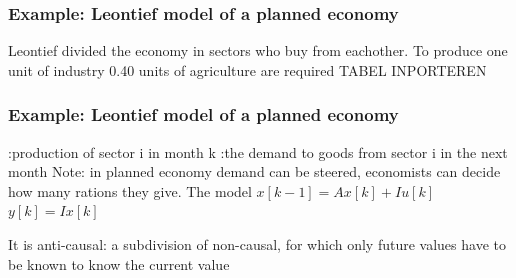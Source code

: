 \begin{frame}
	\frametitle{Example: Leontief model of a planned economy}
	Leontief divided the economy in sectors who buy from eachother.
	To produce one unit of industry 0.40 units of agriculture are required
	TABEL INPORTEREN
\end{frame}
\begin{frame}
	\frametitle{Example: Leontief model of a planned economy}
		     :production of sector i in month k
		     :the demand to goods from sector i in the next month
		     Note: in planned economy demand can be steered, economists can decide how many rations they give.
		     The model
		     $ x[k-1] = A x[k] + I u[k]$\\
		     $y[k] = I x[k]$
		     
		     It is anti-causal: a subdivision of non-causal, for which only future values have to be known to know the current value
		     
\end{frame}


